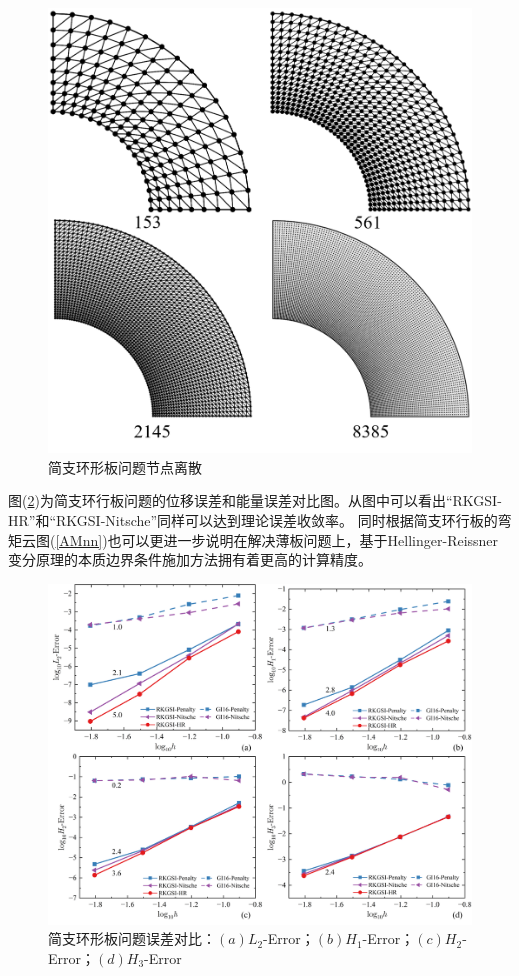 \begin{figure}[!h]
    \centering
    \includegraphics[scale=0.35]{figure/P/A/annular.msh.png}
    \caption{简支环形板问题节点离散}\label{annularmsh}
\end{figure}
图(\ref{PQLH})为简支环行板问题的位移误差和能量误差对比图。从图中可以看出“RKGSI-HR”和“RKGSI-Nitsche”同样可以达到理论误差收敛率。
同时根据简支环行板的弯矩云图(\ref{AMnn})也可以更进一步说明在解决薄板问题上，基于Hellinger-Reissner变分原理的本质边界条件施加方法拥有着更高的计算精度。\par
\begin{figure}[!h]
    \centering
    \includegraphics[scale=0.6]{figure/P/A/QLH.png}
    \caption{简支环形板问题误差对比：$(a)L_2$-Error；$(b)H_1$-Error；$(c)H_2$-Error；$(d)H_3$-Error}\label{PQLH}
\end{figure}
